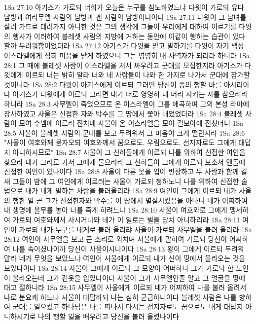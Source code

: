1Sa 27:10  아기스가 가로되 너희가 오늘은 누구를 침노하였느냐 다윗이 가로되 유다 남방과 여라무엘 사람의 남방과 겐 사람의 남방이니이다
1Sa 27:11  다윗이 그 남녀를 살려 가드로 데려가지 아니한 것은 그의 생각에 그들이 우리에게 대하여 이르기를 다윗의 행사가 이러하여 블레셋 사람의 지방에 거하는 동안에 이같이 행하는 습관이 있다 할까 두려워함이었더라
1Sa 27:12  아기스가 다윗을 믿고 말하기를 다윗이 자기 백성 이스라엘에게 심히 미움을 받게 하였으니 그는 영영히 내 사역자가 되리라 하니라
1Sa 28:1  그 때에 블레셋 사람이 이스라엘을 쳐서 싸우려고 군대를 모집한지라 아기스가 다윗에게 이르되 너는 밝히 알라 너와 네 사람들이 나와 한 가지로 나가서 군대에 참가할 것이니라
1Sa 28:2  다윗이 아기스에게 이르되 그러면 당신이 종의 행할 바를 아시리이다 아기스가 다윗에게 이르되 그러면 내가 너로 영영히 내 머리 지키는 자를 삼으리라 하니라
1Sa 28:3  사무엘이 죽었으므로 온 이스라엘이 그를 애곡하며 그의 본성 라마에 장사하였고 사울은 신접한 자와 박수를 그 땅에서 쫓아 내었었더라
1Sa 28:4  블레셋 사람이 모여 수넴에 이르러 진치매 사울이 온 이스라엘을 모아 길보아에 진쳤더니
1Sa 28:5  사울이 블레셋 사람의 군대를 보고 두려워서 그 마음이 크게 떨린지라
1Sa 28:6  "사울이 여호와께 묻자오되 여호와께서 꿈으로도, 우림으로도, 선지자로도 그에게 대답지 아니하시므로"
1Sa 28:7  사울이 그 신하들에게 이르되 나를 위하여 신접한 여인을 찾으라 내가 그리로 가서 그에게 물으리라 그 신하들이 그에게 이르되 보소서 엔돌에 신접한 여인이 있나이다
1Sa 28:8  사울이 다른 옷을 입어 변장하고 두 사람과 함께 갈새 그들이 밤에 그 여인에게 이르러는 사울이 가로되 청하노니 나를 위하여 신접한 술법으로 내가 네게 말하는 사람을 불러올리라
1Sa 28:9  여인이 그에게 이르되 네가 사울의 행한 일 곧 그가 신접한자와 박수를 이 땅에서 멸절시켰음을 아나니 네가 어찌하여 내 생명에 올무를 놓아 나를 죽게 하려느냐
1Sa 28:10  사울이 여호와로 그에게 맹세하여 가로되 여호와께서 사시거니와 네가 이 일로는 벌을 당치 아니하리라
1Sa 28:11  여인이 가로되 내가 누구를 네게로 불러 올리랴 사울이 가로되 사무엘을 불러 올리라
1Sa 28:12  여인이 사무엘을 보고 큰 소리로 외치며 사울에게 말하여 가로되 당신이 어찌하여 나를 속이셨나이까 당신이 사울이시니이다
1Sa 28:13  왕이 그에게 이르되 두려워 말라 네가 무엇을 보았느냐 여인이 사울에게 이르되 내가 신이 땅에서 올라오는 것을 보았나이다
1Sa 28:14  사울이 그에게 이르되 그 모양이 어떠하냐 그가 가로되 한 노인이 올라오는데 그가 겉옷을 입었나이다 사울이 그가 사무엘인줄 알고 그 얼굴을 땅에 대고 절하니라
1Sa 28:15  사무엘이 사울에게 이르되 네가 어찌하여 나를 불러 올려서 나로 분요케 하느냐 사울이 대답하되 나는 심히 군급하니이다 블레셋 사람은 나를 향하여 군대를 일으켰고 하나님은 나를 떠나서 다시는 선지자로도 꿈으로도 내게 대답지 아니하시기로 나의 행할 일을 배우려고 당신을 불러 올렸나이다
